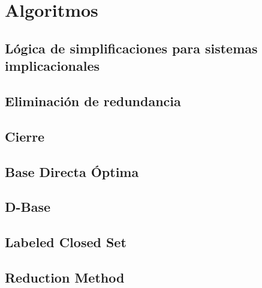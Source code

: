 \section{Algoritmos}

\subsection{L\'ogica de simplificaciones para sistemas implicacionales}

 
\newpage

\subsection{Eliminaci\'on de redundancia}

 
\newpage

\subsection{Cierre}

 
\newpage

\subsection{Base Directa \'Optima}

 
\newpage

\subsection{D-Base}

 
\newpage

\subsection{Labeled Closed Set}

 
\newpage

\subsection{Reduction Method}

 

\newpage
\thispagestyle{empty}
\mbox{}

\newpage